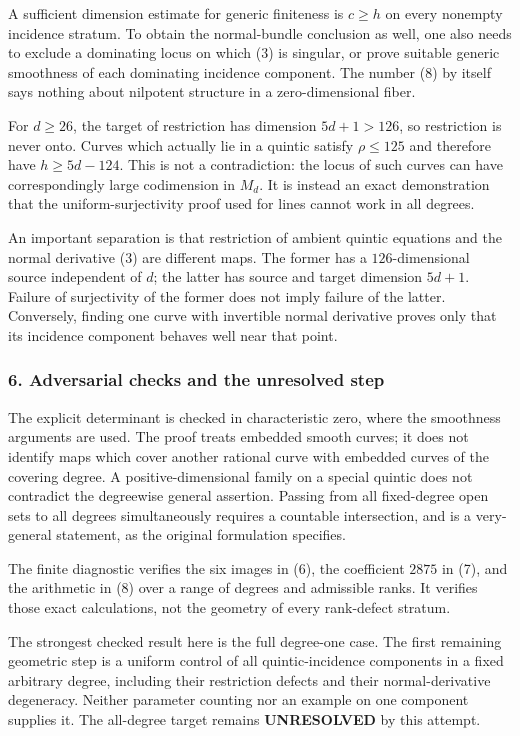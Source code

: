 \documentclass[11pt]{article}
\begin{document}
A sufficient dimension estimate for generic finiteness is $c\ge h$ on every nonempty incidence stratum. To obtain the normal-bundle conclusion as well, one also needs to exclude a dominating locus on which (3) is singular, or prove suitable generic smoothness of each dominating incidence component. The number (8) by itself says nothing about nilpotent structure in a zero-dimensional fiber.

For $d\ge26$, the target of restriction has dimension $5d+1>126$, so restriction is never onto. Curves which actually lie in a quintic satisfy $\rho\le125$ and therefore have
$h\ge5d-124$. This is not a contradiction: the locus of such curves can have correspondingly large codimension in $M_d$. It is instead an exact demonstration that the uniform-surjectivity proof used for lines cannot work in all degrees.

An important separation is that restriction of ambient quintic equations and the normal derivative (3) are different maps. The former has a $126$-dimensional source independent of $d$; the latter has source and target dimension $5d+1$. Failure of surjectivity of the former does not imply failure of the latter. Conversely, finding one curve with invertible normal derivative proves only that its incidence component behaves well near that point.

\subsubsection{6. Adversarial checks and the unresolved step}
The explicit determinant is checked in characteristic zero, where the smoothness arguments are used. The proof treats embedded smooth curves; it does not identify maps which cover another rational curve with embedded curves of the covering degree. A positive-dimensional family on a special quintic does not contradict the degreewise general assertion. Passing from all fixed-degree open sets to all degrees simultaneously requires a countable intersection, and is a very-general statement, as the original formulation specifies.

The finite diagnostic verifies the six images in (6), the coefficient $2875$ in (7), and the arithmetic in (8) over a range of degrees and admissible ranks. It verifies those exact calculations, not the geometry of every rank-defect stratum.

The strongest checked result here is the full degree-one case. The first remaining geometric step is a uniform control of all quintic-incidence components in a fixed arbitrary degree, including their restriction defects and their normal-derivative degeneracy. Neither parameter counting nor an example on one component supplies it. The all-degree target remains \textbf{UNRESOLVED} by this attempt.
\end{document}
